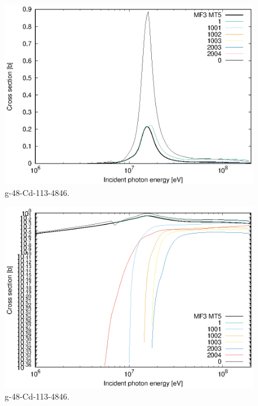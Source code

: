 \begin{figure}
 \includegraphics[width=\linewidth]{eps/g_48-Cd-113_4846.eps}
  \caption{g-48-Cd-113-4846.}
\end{figure}
\begin{figure}
 \includegraphics[width=\linewidth]{eps-log/g_48-Cd-113_4846.eps}
 \caption{g-48-Cd-113-4846.}
\end{figure}
\newpage \clearpage

